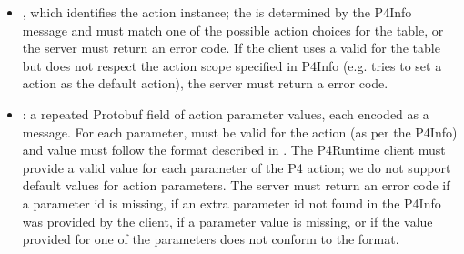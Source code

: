\documentclass[11pt]{article}
\begin{document}
{%
\begin{itemize}%

\item{}
, which identifies the action instance; the  is
determined by the P4Info message and must match one of the possible action
choices for the table, or the server must return an  error
code. If the client uses a valid  for the table but does not
respect the action scope specified in P4Info (e.g. tries to set a 
action as the default action), the server must return a 
error code.%

\item{}
: a repeated Protobuf field of action parameter values, each encoded
as a  message. For each parameter,  must be valid for the
action (as per the P4Info) and value must follow the format described in
. The P4Runtime client must provide a valid
value for each parameter of the P4 action; we do not support default values
for action parameters. The server must return an  error code
if a parameter id is missing, if an extra parameter \textemdash{} id not found in the
P4Info \textemdash{} was provided by the client, if a parameter value is missing, or if
the value provided for one of the parameters does not conform to the
 format.%
\end{itemize}%

}
\end{document}

